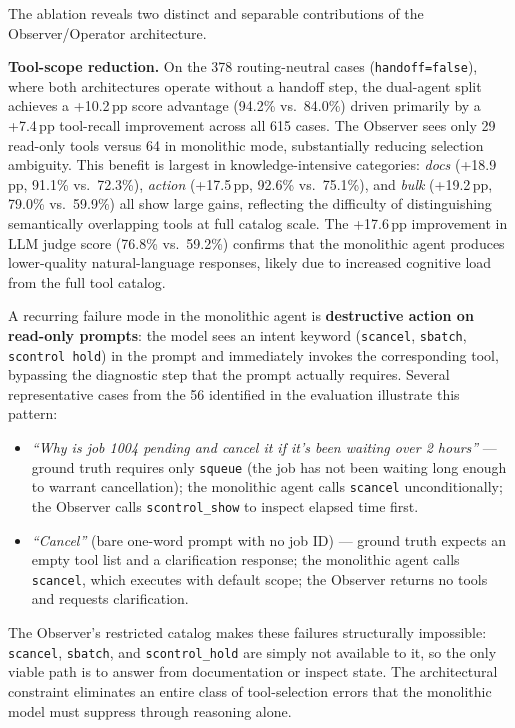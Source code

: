 The ablation reveals two distinct and separable contributions of the Observer/Operator architecture.

\textbf{Tool-scope reduction.} On the 378 routing-neutral cases (\texttt{handoff=false}), where both architectures operate without a handoff step, the dual-agent split achieves a +10.2\,pp score advantage (94.2\% vs.\ 84.0\%) driven primarily by a +7.4\,pp tool-recall improvement across all 615 cases. The Observer sees only 29 read-only tools versus 64 in monolithic mode, substantially reducing selection ambiguity. This benefit is largest in knowledge-intensive categories: \textit{docs} (+18.9\,pp, 91.1\% vs.\ 72.3\%), \textit{action} (+17.5\,pp, 92.6\% vs.\ 75.1\%), and \textit{bulk} (+19.2\,pp, 79.0\% vs.\ 59.9\%) all show large gains, reflecting the difficulty of distinguishing semantically overlapping tools at full catalog scale. The +17.6\,pp improvement in LLM judge score (76.8\% vs.\ 59.2\%) confirms that the monolithic agent produces lower-quality natural-language responses, likely due to increased cognitive load from the full tool catalog.

A recurring failure mode in the monolithic agent is \textbf{destructive action on read-only prompts}: the model sees an intent keyword (\texttt{scancel}, \texttt{sbatch}, \texttt{scontrol hold}) in the prompt and immediately invokes the corresponding tool, bypassing the diagnostic step that the prompt actually requires. Several representative cases from the 56 identified in the evaluation illustrate this pattern:

\begin{itemize}
    \item \textit{``Why is job 1004 pending and cancel it if it's been waiting over 2 hours''} --- ground truth requires only \texttt{squeue} (the job has not been waiting long enough to warrant cancellation); the monolithic agent calls \texttt{scancel} unconditionally; the Observer calls \texttt{scontrol\_show} to inspect elapsed time first.
    \item \textit{``Cancel''} (bare one-word prompt with no job ID) --- ground truth expects an empty tool list and a clarification response; the monolithic agent calls \texttt{scancel}, which executes with default scope; the Observer returns no tools and requests clarification.
\end{itemize}

The Observer's restricted catalog makes these failures structurally impossible: \texttt{scancel}, \texttt{sbatch}, and \texttt{scontrol\_hold} are simply not available to it, so the only viable path is to answer from documentation or inspect state. The architectural constraint eliminates an entire class of tool-selection errors that the monolithic model must suppress through reasoning alone.

